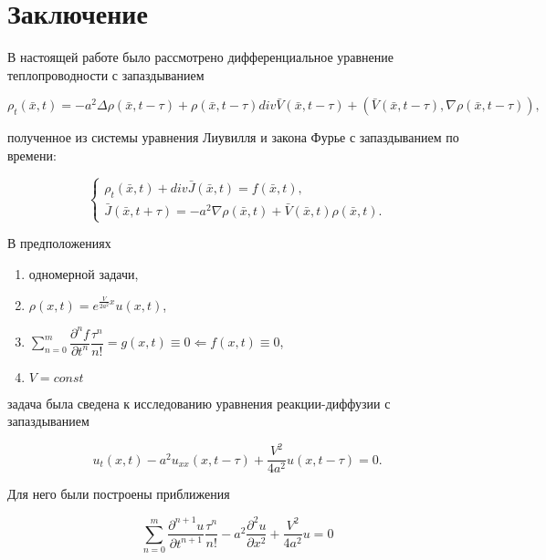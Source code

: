 \section*{Заключение}

В настоящей работе было рассмотрено дифференциальное уравнение теплопроводности с запаздыванием

\begin{equation*}
\rho_t(\bar{x},t) = -a^2 \Delta \rho(\bar{x},t-\tau) + \rho(\bar{x},t-\tau) div \bar{V}(\bar{x},t-\tau) + (\bar{V}(\bar{x},t-\tau),\nabla \rho(\bar{x},t-\tau)),
\end{equation*}

полученное из системы уравнения Лиувилля и закона Фурье с запаздыванием по времени:

\begin{equation*}
\left\{
\begin{aligned}
\rho_t(\bar{x},t) + div \bar{J}(\bar{x},t) = f(\bar{x},t),\\
\bar{J}(\bar{x},t+\tau) = -a^2 \nabla \rho(\bar{x},t) + \bar{V}(\bar{x},t) \rho(\bar{x},t).
\end{aligned}
\right.
\end{equation*}

В предположениях

\begin{enumerate}
\item одномерной задачи,
\item $\rho (x,t) = e^{\frac{V}{2a^2} x} u(x,t)$,
\item $\sum\limits_{n=0}^{m} \dfrac{\partial^n f}{\partial t^n} \dfrac{\tau^n}{n!} = g(x,t) \equiv 0 \Leftarrow f(x,t) \equiv 0$,
\item $V=const$
\end{enumerate}

задача была сведена к исследованию уравнения реакции-диффузии с запаздыванием

\begin{equation*}
u_t (x,t) - a^2 u_{xx} (x,t-\tau) + \dfrac{V^2}{4a^2} u (x,t-\tau) = 0.
\end{equation*}

Для него были построены приближения

\begin{equation*}
\sum\limits_{n=0}^{m} \dfrac{\partial^{n+1} u}{\partial t^{n+1}} \dfrac{\tau^n}{n!} - a^2 \dfrac{\partial^2 u}{\partial x^2} + \dfrac{V^2}{4a^2} u = 0
\end{equation*}

